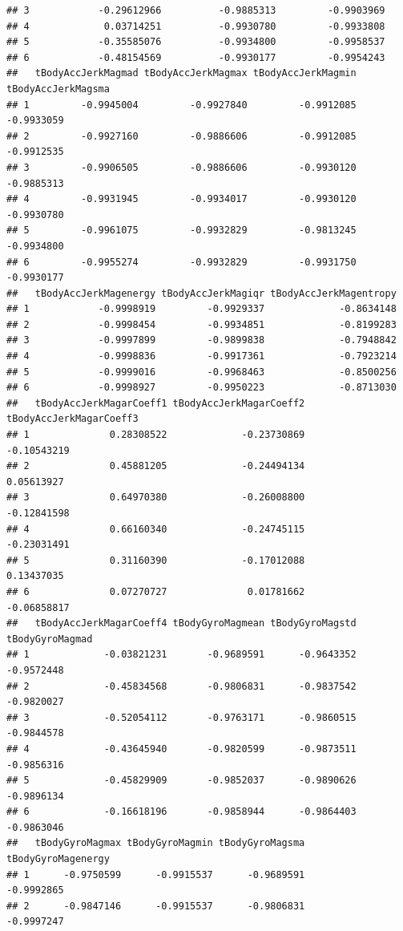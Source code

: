 \documentclass[
]{article}
\begin{document}
\begin{verbatim}
## 3            -0.29612966          -0.9885313         -0.9903969
## 4             0.03714251          -0.9930780         -0.9933808
## 5            -0.35585076          -0.9934800         -0.9958537
## 6            -0.48154569          -0.9930177         -0.9954243
##   tBodyAccJerkMagmad tBodyAccJerkMagmax tBodyAccJerkMagmin tBodyAccJerkMagsma
## 1         -0.9945004         -0.9927840         -0.9912085         -0.9933059
## 2         -0.9927160         -0.9886606         -0.9912085         -0.9912535
## 3         -0.9906505         -0.9886606         -0.9930120         -0.9885313
## 4         -0.9931945         -0.9934017         -0.9930120         -0.9930780
## 5         -0.9961075         -0.9932829         -0.9813245         -0.9934800
## 6         -0.9955274         -0.9932829         -0.9931750         -0.9930177
##   tBodyAccJerkMagenergy tBodyAccJerkMagiqr tBodyAccJerkMagentropy
## 1            -0.9998919         -0.9929337             -0.8634148
## 2            -0.9998454         -0.9934851             -0.8199283
## 3            -0.9997899         -0.9899838             -0.7948842
## 4            -0.9998836         -0.9917361             -0.7923214
## 5            -0.9999016         -0.9968463             -0.8500256
## 6            -0.9998927         -0.9950223             -0.8713030
##   tBodyAccJerkMagarCoeff1 tBodyAccJerkMagarCoeff2 tBodyAccJerkMagarCoeff3
## 1              0.28308522             -0.23730869             -0.10543219
## 2              0.45881205             -0.24494134              0.05613927
## 3              0.64970380             -0.26008800             -0.12841598
## 4              0.66160340             -0.24745115             -0.23031491
## 5              0.31160390             -0.17012088              0.13437035
## 6              0.07270727              0.01781662             -0.06858817
##   tBodyAccJerkMagarCoeff4 tBodyGyroMagmean tBodyGyroMagstd tBodyGyroMagmad
## 1             -0.03821231       -0.9689591      -0.9643352      -0.9572448
## 2             -0.45834568       -0.9806831      -0.9837542      -0.9820027
## 3             -0.52054112       -0.9763171      -0.9860515      -0.9844578
## 4             -0.43645940       -0.9820599      -0.9873511      -0.9856316
## 5             -0.45829909       -0.9852037      -0.9890626      -0.9896134
## 6             -0.16618196       -0.9858944      -0.9864403      -0.9863046
##   tBodyGyroMagmax tBodyGyroMagmin tBodyGyroMagsma tBodyGyroMagenergy
## 1      -0.9750599      -0.9915537      -0.9689591         -0.9992865
## 2      -0.9847146      -0.9915537      -0.9806831         -0.9997247

\end{verbatim}
\end{document}
